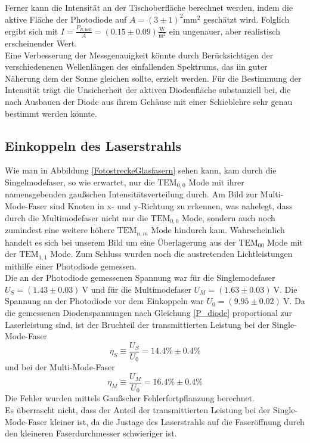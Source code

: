 \documentclass[11pt,a4paper,oneside]{scrartcl}
\begin{document}
Ferner kann die Intensität an der Tischoberfläche berechnet werden, indem die aktive Fläche der Photodiode auf $A=(3\pm1)^2\mathrm{mm}^2$ geschätzt wird. Folglich ergibt sich mit $I=\frac{P_{R,\mathrm{hell}}}{A}=(0.15\pm0.09)\frac{\mathrm{W}}{\mathrm m^2}$ ein ungenauer, aber realistisch erscheinender Wert. \\
Eine Verbesserung der Messgenauigkeit könnte durch Berücksichtigen der verschiedenenen Wellenlängen des einfallenden Spektrums, das iin guter Näherung dem der Sonne gleichen sollte, erzielt werden. Für die Bestimmung der Intensität trägt die Unsicherheit der aktiven Diodenfläche substanziell bei, die nach Ausbauen der Diode aus ihrem Gehäuse mit einer Schieblehre sehr genau bestimmt werden könnte.
\subsection{Einkoppeln des Laserstrahls}
Wie man in Abbildung \ref{FotostreckeGlasfasern} sehen kann, kam durch die Singelmodefaser, so wie erwartet, nur die $\mathrm{TEM}_{0,0}$ Mode mit ihrer namensgebenden gaußschen Intensitätsverteilung durch. Am Bild zur Multi-Mode-Faser sind Knoten in x- und y-Richtung zu erkennen, was nahelegt, dass durch die Multimodefaser nicht nur die $\mathrm{TEM}_{0,0}$ Mode, sondern auch noch zumindest eine weitere höhere $\mathrm{TEM}_{n,m}$  Mode hindurch kam. 
Wahrscheinlich handelt es sich bei unserem Bild um eine Überlagerung aus der $\mathrm{TEM}_{00}$ Mode mit der $\mathrm{TEM}_{1,1}$ Mode. Zum Schluss wurden noch die austretenden Lichtleistungen mithilfe einer Photodiode gemessen. \\
Die an der Photodiode gemessenen Spannung
war für die Singlemodefaser $U_S=(1.43\pm0.03)\ \mathrm V$ und für die Multimodefaser $U_M=(1.63\pm 0.03)\ \mathrm V$. Die Spannung an der Photodiode vor dem Einkoppeln war $U_0=(9.95\pm 0.02)\ \mathrm V$. Da die gemessenen Diodenspannungen nach Gleichung \ref{P_diode} proportional zur Laserleistung sind, ist der Bruchteil der transmittierten Leistung bei der Single-Mode-Faser
\begin{equation}
\eta_S\equiv \frac{U_S}{U_0}=14.4\%\pm0.4\%
\end{equation}
und bei der Multi-Mode-Faser
\begin{equation}
\eta_M\equiv \frac{U_M}{U_0}=16.4\%\pm0.4\%
\end{equation}
Die Fehler wurden mittels Gaußscher Fehlerfortpflanzung berechnet.\\
Es überrascht nicht, dass der Anteil der transmittierten Leistung bei der Single-Mode-Faser kleiner ist, da die Justage des Laserstrahls auf die Faseröffnung durch den kleineren Faserdurchmesser schwieriger ist.\\
\end{document}
